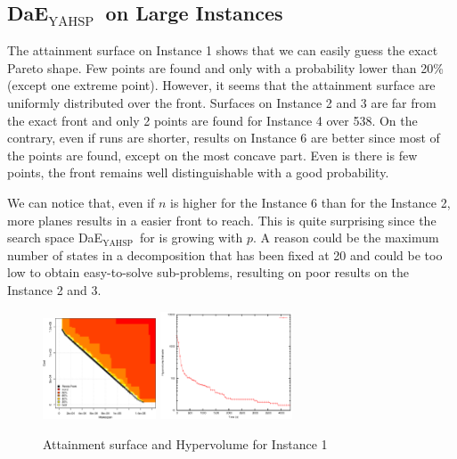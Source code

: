 \documentclass{llncs}
\newcommand{\DAEYAHSP}{{\sc DaE$_{\text{YAHSP}}$}}
\begin{document}
\subsection{\DAEYAHSP\ on Large Instances}

The attainment surface on Instance 1 shows that we can easily guess the exact Pareto shape. Few points are found and only with a probability lower than 20\% (except one extreme point). However, it seems that the attainment surface are uniformly distributed over the front. Surfaces on Instance 2 and 3 are far from the exact front and only 2 points are found for Instance 4 over 538. On the contrary, even if runs are shorter, results on Instance 6 are better since most of the points are found, except on the most concave part. Even is there is few points, the front remains well distinguishable with a good probability.

We can notice that, even if $n$ is higher for the Instance 6 than for the Instance 2, more planes results in a easier front to reach. This is quite surprising since the search space \DAEYAHSP\ for is growing with $p$. A reason could be the maximum number of states in a decomposition that has been fixed at 20 and could be too low to obtain easy-to-solve sub-problems, resulting on poor results on the Instance 2 and 3.

\begin{figure}[h!]
  \centering
      \includegraphics[width=0.30\textwidth]{large_1_att_area}
      \includegraphics[width=0.35\textwidth]{large_1_hyp}
 \caption{\label{instance5} Attainment surface and Hypervolume for Instance 1}
\end{figure}
\end{document}
